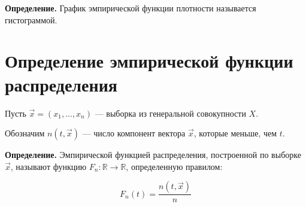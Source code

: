 \textbf{Определение.} График эмпирической функции плотности называется
гистограммой.

\section{Определение эмпирической функции распределения}

Пусть $\vec{x} = (x_1, ..., x_n)$ --- выборка из генеральной совокупности $X$.

Обозначим $n(t, \vec{x})$ --- число компонент вектора $\vec{x}$,
которые меньше, чем $t$.

\textbf{Определение.} Эмпирической функцией распределения, построенной по
выборке $\vec{x}$, называют функцию $F_n: \mathbb{R} \to \mathbb{R}$,
определенную правилом: 

\begin{equation}
    F_n(t) = \frac{n(t, \vec x)}{n}
\end{equation}
